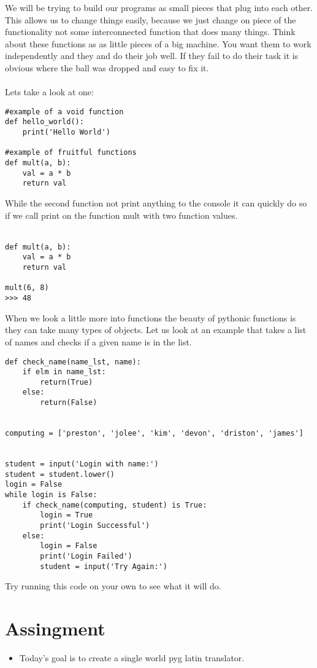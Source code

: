 \documentclass[../main.tex]{subfiles}
\begin{document}
We will be trying to build our programs as small pieces that plug into each other. This allows us to change things easily, because we just change on piece of the functionality not some interconnected function that does many things. Think about these functions as as little pieces of a big machine. You want them to work independently and they and do their job well. If they fail to do their task it is obvious where the ball was dropped and easy to fix it.\\
\\
Lets take a look at one:
\begin{lstlisting}
#example of a void function
def hello_world():
    print('Hello World')

#example of fruitful functions
def mult(a, b):
    val = a * b
    return val
\end{lstlisting}
While the second function not print anything to the console it can quickly do so if we call print on the function mult with two function values.\\
\\
\begin{lstlisting}
def mult(a, b):
    val = a * b
    return val

mult(6, 8)
>>> 48
\end{lstlisting}
When we look a little more into functions the beauty of pythonic functions is they can take many types of objects. Let us look at an example that takes a list of names and checks if a given name is in the list.
\begin{lstlisting}
def check_name(name_lst, name):
    if elm in name_lst:
        return(True)
    else:
        return(False)


computing = ['preston', 'jolee', 'kim', 'devon', 'driston', 'james']


student = input('Login with name:')
student = student.lower()
login = False
while login is False:
    if check_name(computing, student) is True:
        login = True
        print('Login Successful')
    else:
        login = False
        print('Login Failed')
        student = input('Try Again:')

\end{lstlisting}

Try running this code on your own to see what it will do.
\section{Assingment}
\begin{itemize}
    \item Today's goal is to create a single world pyg latin translator.
\end{itemize}


\newpage
\end{document}
